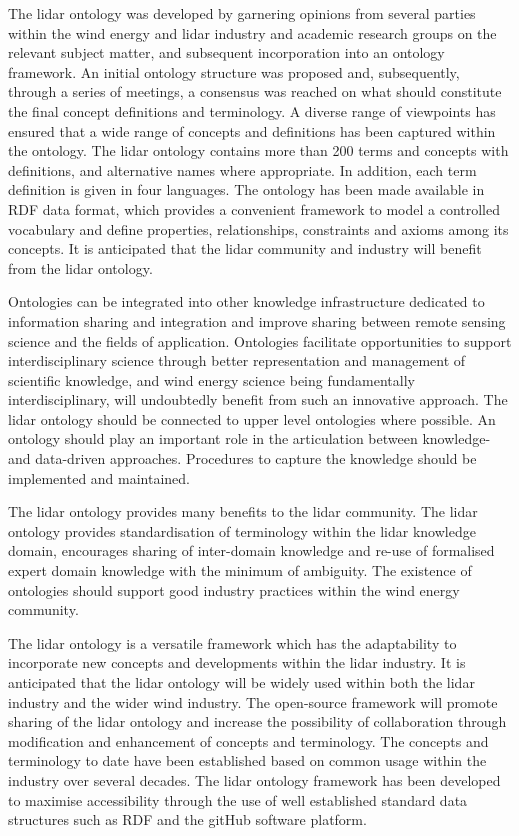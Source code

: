 \documentclass[remotesensing,article,submit,pdftex,moreauthors]{Definitions/mdpi}
\begin{document}
The lidar ontology was developed by garnering opinions from several parties within the wind energy and lidar industry and academic research groups on the relevant subject matter, and subsequent incorporation into an ontology framework. 
An initial ontology structure was proposed and, subsequently, through a series of meetings, a consensus was reached on what should constitute the final concept definitions and terminology.
A diverse range of viewpoints has ensured that a wide range of concepts and definitions has been captured within the ontology. 
The lidar ontology contains more than 200 terms and concepts with definitions, and alternative names where appropriate. In addition, each term definition is given in four languages. 
The ontology has been made available in RDF data format, which provides a convenient framework to model a controlled vocabulary and define properties, relationships, constraints and axioms among its concepts.
It is anticipated that the lidar community and industry will benefit from the lidar ontology.

Ontologies can be integrated into other knowledge infrastructure dedicated to information sharing and integration and improve sharing between remote sensing science and the fields of application. Ontologies facilitate opportunities to support interdisciplinary science through better representation and management of scientific knowledge, and wind energy science being fundamentally interdisciplinary, will undoubtedly benefit from such an innovative approach.
The lidar ontology should be connected to upper level ontologies where possible.
An ontology should play an important role in the articulation between knowledge- and data-driven approaches.
Procedures to capture the knowledge should be implemented and maintained. 

The lidar ontology provides many benefits to the lidar community.
The lidar ontology provides standardisation of terminology within the lidar knowledge domain, encourages sharing of inter-domain knowledge and re-use of formalised expert domain knowledge with the minimum of ambiguity. The existence of ontologies should support good industry practices within the wind energy community.

The lidar ontology is a versatile framework which has the adaptability to incorporate new concepts and developments within the lidar industry.
It is anticipated that the lidar ontology will be widely used within both the lidar industry and the wider wind industry.
The open-source framework will promote sharing of the lidar ontology and increase the possibility of collaboration through modification and enhancement of concepts and terminology. 
The concepts and terminology to date have been established based on common usage within the industry over several decades.
The lidar ontology framework has been developed to maximise accessibility through the use of well established standard data structures such as RDF and the gitHub software platform.
\end{document}
